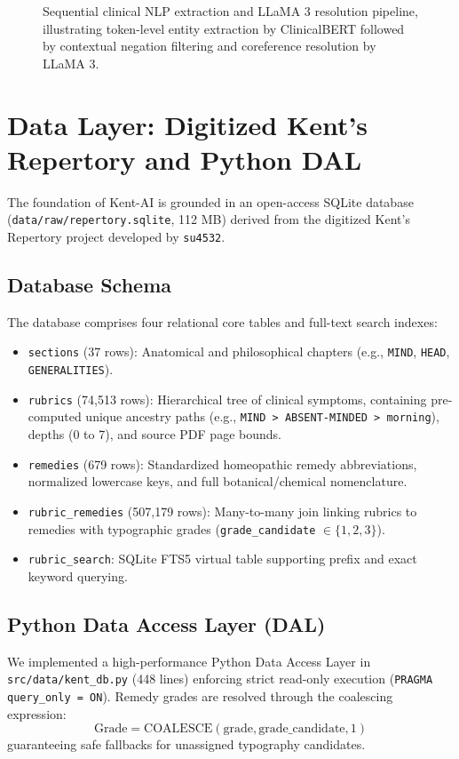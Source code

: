 \begin{sloppypar}
\begin{figure}[htp]
{\begin{tikzpicture}
\end{tikzpicture}
}
\caption{Sequential clinical NLP extraction and LLaMA 3 resolution pipeline, illustrating token-level entity extraction by ClinicalBERT followed by contextual negation filtering and coreference resolution by LLaMA 3.}
\label{fig:sequential_pipeline}
\end{figure}

\section{Data Layer: Digitized Kent's Repertory and Python DAL}
The foundation of Kent-AI is grounded in an open-access SQLite database (\texttt{data/raw/repertory.sqlite}, 112 MB) derived from the digitized Kent's Repertory project developed by \texttt{su4532}. 

\subsection{Database Schema}
The database comprises four relational core tables and full-text search indexes:
\begin{itemize}
    \item \texttt{sections} (37 rows): Anatomical and philosophical chapters (e.g., \texttt{MIND}, \texttt{HEAD}, \texttt{GENERALITIES}).
    \item \texttt{rubrics} (74,513 rows): Hierarchical tree of clinical symptoms, containing pre-computed unique ancestry paths (e.g., \texttt{MIND > ABSENT-MINDED > morning}), depths (0 to 7), and source PDF page bounds.
    \item \texttt{remedies} (679 rows): Standardized homeopathic remedy abbreviations, normalized lowercase keys, and full botanical/chemical nomenclature.
    \item \texttt{rubric\_remedies} (507,179 rows): Many-to-many join linking rubrics to remedies with typographic grades (\texttt{grade\_candidate} $\in \{1, 2, 3\}$).
    \item \texttt{rubric\_search}: SQLite FTS5 virtual table supporting prefix and exact keyword querying.
\end{itemize}

\subsection{Python Data Access Layer (DAL)}
We implemented a high-performance Python Data Access Layer in \texttt{src/data/kent\_db.py} (448 lines) enforcing strict read-only execution (\texttt{PRAGMA query\_only = ON}). Remedy grades are resolved through the coalescing expression:
\begin{equation}
    \text{Grade} = \text{COALESCE}(\text{grade}, \text{grade\_candidate}, 1)
\end{equation}
guaranteeing safe fallbacks for unassigned typography candidates.


\end{sloppypar}
